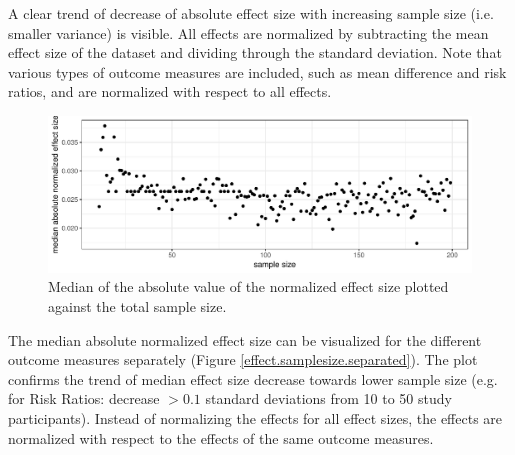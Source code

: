 \documentclass[11pt,a4paper,twoside]{book}\usepackage[]{graphicx}\usepackage[]{color}
\newenvironment{knitrout}{}{} %
\begin{document}
\vspace{0mm}
A clear trend of decrease of absolute effect size with increasing sample size (i.e. smaller variance) is visible. 
All effects are normalized by subtracting the mean effect size of the dataset and dividing through the standard deviation. Note that various types of outcome measures are included, such as mean difference and risk ratios, and are normalized with respect to all effects.

\begin{figure}
\begin{knitrout}
\color{fgcolor}

{\centering \includegraphics[width=\textwidth-3cm]{figure/ch02_figunnamed-chunk-16-1} 

}



\end{knitrout}
\caption{Median of the absolute value of the normalized effect size plotted against the total sample size.}
\label{effect.samplesize}
\end{figure}

The median absolute normalized effect size can be visualized for the different outcome measures separately (Figure \ref{effect.samplesize.separated}). The plot confirms the trend of median effect size decrease towards lower sample size (e.g. for Risk Ratios: decrease $> 0.1$ standard deviations from 10 to 50 study participants). Instead of normalizing the effects 
for all effect sizes, the effects are normalized with respect to the effects of the same outcome measures. 
\end{document}
